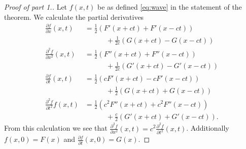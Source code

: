 \begin{proof}[Proof of part 1.]
    Let \(f(x,t)\) be as defined \eqref{eq:wave} in the statement of the theorem.
    We calculate the partial derivatives
    \[
        \begin{aligned}
            \tfrac{\partial f}{\partial x} (x,t)
             & = \tfrac{1}{2} \left(F'(x+ct) + F'(x-ct)\right)          \\
             & \quad\quad\quad
            + \tfrac{1}{2c}\left(G(x+ct) - G(x-ct)\right)               \\
            \tfrac{\partial^2 f}{\partial x^2}(x,t)
             & = \tfrac{1}{2} \left(F''(x+ct) + F''(x-ct)\right)        \\
             & \quad\quad\quad
            + \tfrac{1}{2c}\left(G'(x+ct) - G'(x-ct)\right)             \\
            \tfrac{\partial f}{\partial t} (x,t)
             & = \tfrac{1}{2} \left(cF'(x+ct) - c F'(x-ct)\right)       \\
             & \quad\quad\quad
            + \tfrac{1}{2}\left(G(x+ct) + G(x-ct)\right)                \\
            \tfrac{\partial^2 f}{\partial t^2} f(x,t)
             & = \tfrac{1}{2} \left(c^2F''(x+ct) + c^2 F''(x-ct)\right) \\
             & \quad\quad\quad
            + \tfrac{c}{2}\left(G'(x+ct) + G'(x-ct)\right).
        \end{aligned}
    \]
    From this calculation we see that  \(   \frac{\partial^2 f}{\partial x^2}(x,t) = c^2  \frac{\partial^2 f}{\partial t^2}(x,t) \).
    Additionally \(f(x,0) = F(x)\)
    and \(\frac{\partial f}{\partial t}(x,0) = G(x)\).
\end{proof}

